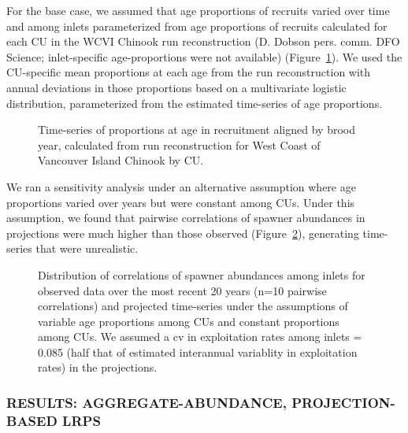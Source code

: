 \documentclass[11pt]{book}
\begin{document}
For the base case, we assumed that age proportions of recruits varied over time and among inlets parameterized from age proportions of recruits calculated for each CU in the WCVI Chinook run reconstruction (D. Dobson pers. comm. DFO Science; inlet-specific age-proportions were not available) (Figure~\ref{fig:chinook-agePpns}). We used the CU-specific mean proportions at each age from the run reconstruction with annual deviations in those proportions based on a multivariate logistic distribution, parameterized from the estimated time-series of age proportions.
\begin{figure}[htb]

{\centering {} 

}

\caption{Time-series of proportions at age in recruitment aligned by brood year, calculated from run reconstruction for West Coast of Vancouver Island Chinook by CU.}\label{fig:chinook-agePpns}
\end{figure}
We ran a sensitivity analysis under an alternative assumption where age proportions varied over years but were constant among CUs. Under this assumption, we found that pairwise correlations of spawner abundances in projections were much higher than those observed (Figure~\ref{fig:chinook-boxplotsAge}), generating time-series that were unrealistic.
\begin{figure}[htb]

{\centering {} 

}

\caption{Distribution of correlations of spawner abundances among inlets for observed data over the most recent 20 years (n=10 pairwise correlations) and projected time-series under the assumptions of variable age proportions among CUs and constant proportions among CUs. We assumed a cv in exploitation rates among inlets = 0.085 (half that of estimated interannual variablity in exploitation rates) in the projections.}\label{fig:chinook-boxplotsAge}
\end{figure}
\hypertarget{results-aggregate-abundance-projection-based-lrps}{%
\subsubsection{RESULTS: AGGREGATE-ABUNDANCE, PROJECTION-BASED LRPS}\label{results-aggregate-abundance-projection-based-lrps}}
\end{document}
